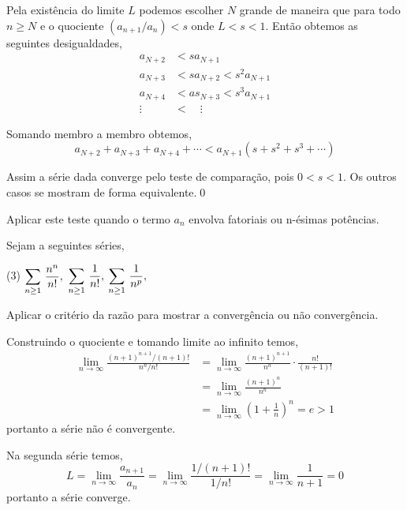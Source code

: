 \prova Pela exist\^{e}ncia do limite $L$ podemos escolher $N$ grande
de maneira que para todo $n\ge N$ e o quociente $(a_{n+1}/a_n)<s$
onde $L<s<1$. Ent\~{a}o obtemos as seguintes desigualdades,
\begin{align*}
    a_{N+2}&<sa_{N+1}\\[2ex]
a_{N+3}&<sa_{N+2}<s^2a_{N+1}\\[2ex]
a_{N+4}&<as_{N+3}<s^3a_{N+1}\\[2ex]
\vdots\quad &< \quad\vdots
\end{align*}

Somando membro a membro obtemos,
\begin{equation*}
    a_{N+2}+a_{N+3}+a_{N+4}+\cdots < a_{N+1}(s+s^2+s^3+\cdots)
\end{equation*}

Assim a s\'{e}rie dada converge pelo teste de compara\c{c}\~{a}o, pois
$0<s<1$. Os outros casos se mostram de forma equivalente.\qed

\begin{obs}
Aplicar este teste quando o termo $a_n$ envolva fatoriais ou
n-\'{e}simas pot\^{e}ncias.
\end{obs}


\begin{exer}
Sejam a seguintes s\'{e}ries,
\begin{tasks}[label=(\alph*),item-indent=6em,label-width=4ex,ref=(\alph*)](3)
\task  \(\displaystyle\sum_{n\geq 1}\,\frac{n^n}{n!},\)
\task  \(\displaystyle \sum_{n\geq 1}\,\frac{1}{n!},\)
\task  \(\displaystyle \sum_{n\geq 1}\,\frac{1}{n^p},\)
\end{tasks}

Aplicar o crit\'{e}rio da raz\~{a}o para mostrar a converg\^{e}ncia ou n\~{a}o
converg\^{e}ncia.
\end{exer}

\solo Construindo o quociente e tomando limite ao infinito temos,
\begin{align*}
  \lim_{n\to\infty}\frac{(n+1)^{n+1}/(n+1)!}{n^n/n!} &= \lim_{n\to\infty}
  \frac{(n+1)^{n+1}}{n^n}\cdot\frac{n!}{(n+1)!}\\[2ex]
   &=\lim_{n\to\infty}\frac{(n+1)^n}{n^n} \\[2ex]
   &=\lim_{n\to\infty}\left(1+\frac{1}{n}\right)^n=e>1
\end{align*}
portanto a s\'{e}rie n\~{a}o \'{e} convergente.

Na segunda s\'{e}rie temos,
\begin{equation*}
  L=\lim_{n\to\infty}\frac{a_{n+1}}{a_n}=\lim_{n\to\infty}\frac{1/(n+1)!}{1/n!}
  =\lim_{n\to\infty}\frac{1}{n+1}=0
\end{equation*}
portanto a s\'{e}rie converge.

